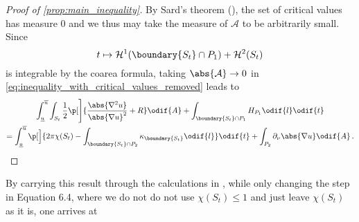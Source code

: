 \documentclass[titlepage,numbers=noenddot,oneside,%
cleardoublepage=empty,paper=a4,fontsize=11pt,%
english,%
]{scrartcl}
\newcommand*{\mathfullstop}{\,.}
\begin{document}
{\begin{proof}[Proof of \cref{prop:main_inequality}]
            
            By Sard's theorem (\cite{sardMeasureCriticalValues1942}), the set of critical values has measure \( 0 \) and we thus may take the measure of \( \mathcal{A} \) to be arbitrarily small. Since
            \begin{equation*}
                t\mapsto \mathcal{H}^1(\boundary{S_t}\cap P_1)+\mathcal{H}^2(S_t)
            \end{equation*}
            is integrable by the coarea formula, taking \( \abs{\mathcal{A}}\to 0 \) in \cref{eq:inequality_with_critical_values_removed} leads to
            \begin{multline*}
                \int_{\minu}^{\maxu} \int_{S_t} \frac{1}{2}\p[\Bigg]{\frac{\abs{\nabla^2 u}}{\abs{\nabla u}^2}+R }\odif{A}+\int_{\boundary{S_t}\cap P_1}H_{P_1}\odif{l}\odif{t}\\
                =\int_{\minu}^{\maxu}\p[\Big]{2\pi \chi(S_t)-\int _{\boundary{S_t} \cap P_2}\kappa_{\boundary{S_t}}\odif{l}}\odif{t}+ \int_{P_2}\partial_{\nu} \abs{\nabla u}\odif{A}\mathfullstop
            \end{multline*}
        \end{proof}}
% 
By carrying this result through the calculations in \cite[Section 6]{brayHarmonicFunctionsMass2019}, while only changing the step in Equation 6.4, where we do not do not use $\chi(S_t)\leq 1$ and just leave \( \chi(S_t) \) as it is, one arrives at
\end{document}
